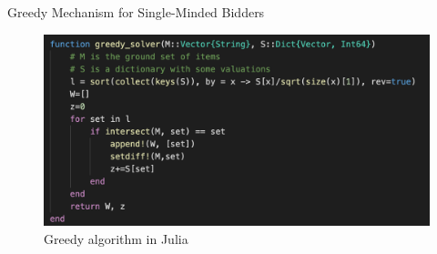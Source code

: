 \documentclass[aspectratio=169,xcolor=dvipsnames]{beamer}
\begin{document}
     \begin{frame}{Greedy Mechanism for Single-Minded Bidders}
     \begin{figure}
        \includegraphics[width=1\textwidth, height=0.7\textheight, keepaspectratio]{utilities/greedy.png}
        \caption{Greedy algorithm in Julia} \label{fig:2}
    \end{figure}
     
     \end{frame}
\end{document}
